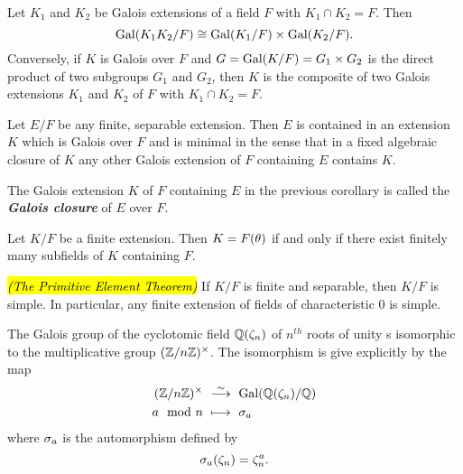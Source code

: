\nl

\begin{cor}
Let $K_1$ and $K_2$ be Galois extensions of a field $F$ with $K_1\cap K_2 = F$. Then
\[\text{Gal}(K_1K_2/ F)\cong \text{Gal}(K_1/ F)\times \text{Gal}(K_2 / F).\]
Conversely, if $K$ is Galois over $F$ and $G = \text{Gal}(K/F) = G_1\times G_2$ is the direct product of two subgroups $G_1$ and $G_2$, then $K$ is the composite of two Galois extensions $K_1$ and $K_2$ of $F$ with $K_1\cap K_2 = F$.
\end{cor}

\nl

\begin{cor}
Let $E/F$ be any finite, separable extension. Then $E$ is contained in an extension $K$ which is Galois over $F$ and is minimal in the sense that in a fixed algebraic closure of $K$ any other Galois extension of $F$ containing $E$ contains $K$.
\end{cor}

\nl

\begin{defn}
The Galois extension $K$ of $F$ containing $E$ in the previous corollary is called the \textit{\textbf{Galois closure}} of $E$ over $F$.
\end{defn}

\nl

\begin{prop}
Let $K/F$ be a finite extension. Then $K = F(\theta)$ if and only if there exist finitely many subfields of $K$ containing $F$.
\end{prop}

\nl

\begin{thm}\hl{\textit{(The Primitive Element Theorem)}} If $K/F$ is finite and separable, then $K/F$ is simple. In particular, any finite extension of fields of characteristic 0 is simple.
\end{thm}

\nl

\begin{thm}
The Galois group of the cyclotomic field $\mathbb{Q}(\zeta_n)$ of $n^{th}$ roots of unity s isomorphic to the multiplicative group $(\mathbb{Z}/n\mathbb{Z})^\times$. The isomorphism is give explicitly by the map
\begin{align*}
(\Z/n\Z)^\times\  &\overset{\sim}{\longrightarrow}\ \Gal(\Q(\zeta_n)/\Q)\\
a\mod n\  &\longmapsto\  \sig_a
\end{align*}
where $\sigma_a$ is the automorphism defined by 
\[\sigma_a(\zeta_n) = \zeta_n^a.\]
\end{thm}

